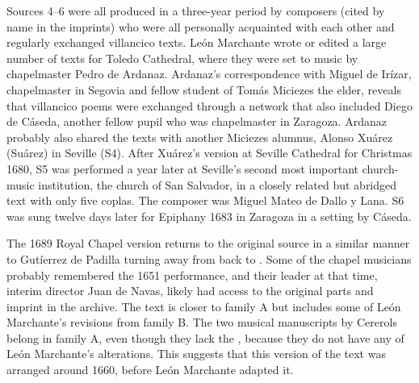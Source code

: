 Sources 4--6 were all produced in a three-year period by composers (cited by
name in the imprints) who were all personally acquainted with each other and
regularly exchanged villancico texts.
León Marchante wrote or edited a large number of texts for Toledo Cathedral,
where they were set to music by chapelmaster Pedro de Ardanaz.
Ardanaz's correspondence with Miguel de Irízar, chapelmaster in Segovia and
fellow student of Tomás Miciezes the elder, reveals that villancico poems were
exchanged through a network that also included Diego de Cáseda, another fellow
pupil who was chapelmaster in Zaragoza.%
    \Autocites
    {Rodriguez:Networks}
    [302--311]{Cashner:PhD}
Ardanaz probably also shared the texts with another Miciezes alumnus, Alonso
Xuárez (Suárez) in Seville (S4).
After Xuárez's version at Seville Cathedral for Christmas 1680, S5 was performed
a year later at Seville's second most important church-music institution, the
church of San Salvador, in a closely related but abridged text with only five
coplas.
The composer was Miguel Mateo de Dallo y Lana.
S6 was sung twelve days later for Epiphany 1683 in Zaragoza in a setting by
Cáseda.



The 1689 Royal Chapel version returns to the original source in a similar manner
to Gutíerrez de Padilla turning away from  back to
.
Some of the chapel musicians probably remembered the 1651 performance, and
their leader at that time, interim director Juan de Navas, likely had access to
the original parts and imprint in the archive.%
    \Autocite[]{DMEH} 
The text is closer to family A but includes some of León Marchante's
revisions from family B.
The two musical manuscripts by Cererols belong in family A, even though they
lack the , because they do not have any of León Marchante's
alterations.
This suggests that this version of the text was arranged around 1660, before
León Marchante adapted it.


